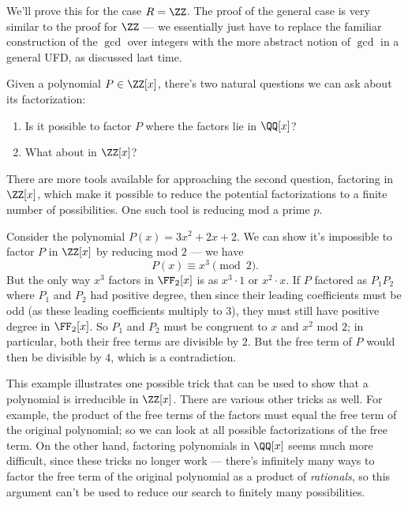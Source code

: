 We'll prove this for the case $R = \ZZ$. The proof of the general case is very similar to the proof for $\ZZ$ --- we essentially just have to replace the familiar construction of the $\gcd$ over integers with the more abstract notion of $\gcd$ in a general UFD, as discussed last time. 

\begin{qq}
Given a polynomial $P \in \ZZ[x]$, there's two natural questions we can ask about its factorization:
\begin{enumerate}
    \item Is it possible to factor $P$ where the factors lie in $\QQ[x]$?
    \item What about in $\ZZ[x]$?
\end{enumerate}
\end{qq}

There are more tools available for approaching the second question, factoring in $\ZZ[x]$, which make it possible to reduce the potential factorizations to a finite number of possibilities. One such tool is reducing mod a prime $p$.

\begin{example}\label{no factorization}
Consider the polynomial $P(x) = 3x^2 + 2x + 2$. We can show it's impossible to factor $P$ in $\ZZ[x]$ by reducing mod $2$ --- we have \[P(x) \equiv x^3 \pmod{2}.\] But the only way $x^3$ factors in $\FF_2[x]$ is as $x^3\cdot 1$ or $x^2\cdot x$. If $P$ factored as $P_1P_2$ where $P_1$ and $P_2$ had positive degree, then since their leading coefficients must be odd (as these leading coefficients multiply to $3$), they must still have positive degree in $\FF_2[x]$. So $P_1$ and $P_2$ must be congruent to $x$ and $x^2$ mod $2$; in particular, both their free terms are divisible by $2$. But the free term of $P$ would then be divisible by $4$, which is a contradiction. 

\end{example}

This example illustrates one possible trick that can be used to show that a polynomial is irreducible in $\ZZ[x]$. There are various other tricks as well. For example, the product of the free terms of the factors must equal the free term of the original polynomial; so we can look at all possible factorizations of the free term. On the other hand, factoring polynomials in $\QQ[x]$ seems much more difficult, since these tricks no longer work --- there's infinitely many ways to factor the free term of the original polynomial as a product of \emph{rationals}, so this argument can't be used to reduce our search to finitely many possibilities. 

